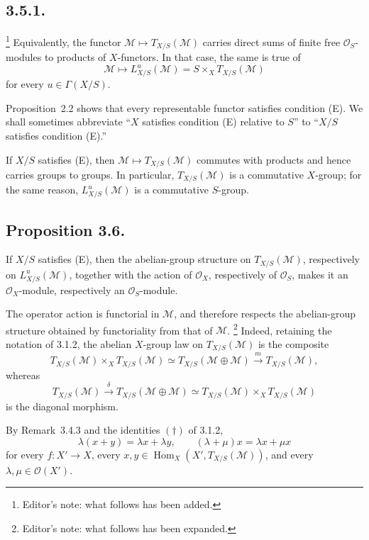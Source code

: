 \subsection*{3.5.1.}
\footnote{Editor's note: what follows has been added.}
Equivalently, the functor
\(\mathcal M\mapsto T_{X/S}(\mathcal M)\) carries direct sums of finite
free \(\mathcal O_S\)-modules to products of \(X\)-functors. In that case,
the same is true of
\[
  \mathcal M\longmapsto L^u_{X/S}(\mathcal M)
  =S\times_XT_{X/S}(\mathcal M)
\]
for every \(u\in\Gamma(X/S)\).

Proposition~2.2 shows that every representable functor satisfies
condition (E). We shall sometimes abbreviate ``\(X\) satisfies condition
(E) relative to \(S\)'' to ``\(X/S\) satisfies condition (E).''

If \(X/S\) satisfies (E), then
\(\mathcal M\mapsto T_{X/S}(\mathcal M)\) commutes with products and hence
carries groups to groups. In particular, \(T_{X/S}(\mathcal M)\) is a
commutative \(X\)-group; for the same reason,
\(L^u_{X/S}(\mathcal M)\) is a commutative \(S\)-group.

\subsection*{Proposition 3.6.}
If \(X/S\) satisfies (E), then the abelian-group structure on
\(T_{X/S}(\mathcal M)\), respectively on \(L^u_{X/S}(\mathcal M)\),
together with the action of \(\mathcal O_X\), respectively of
\(\mathcal O_S\), makes it an \(\mathcal O_X\)-module, respectively an
\(\mathcal O_S\)-module.

The operator action is functorial in \(\mathcal M\), and therefore
respects the abelian-group structure obtained by functoriality from that
of \(\mathcal M\).
\footnote{Editor's note: what follows has been expanded.}
Indeed, retaining the notation of 3.1.2, the abelian \(X\)-group law on
\(T_{X/S}(\mathcal M)\) is the composite
\[
  T_{X/S}(\mathcal M)\times_XT_{X/S}(\mathcal M)
  \simeq T_{X/S}(\mathcal M\oplus\mathcal M)
  \xrightarrow{\ m\ }T_{X/S}(\mathcal M),
\]
whereas
\[
  T_{X/S}(\mathcal M)\xrightarrow{\ \delta\ }
  T_{X/S}(\mathcal M\oplus\mathcal M)
  \simeq T_{X/S}(\mathcal M)\times_XT_{X/S}(\mathcal M)
\]
is the diagonal morphism.

By Remark~3.4.3 and the identities \((\dagger)\) of 3.1.2,
\[
  \lambda(x+y)=\lambda x+\lambda y,
  \qquad
  (\lambda+\mu)x=\lambda x+\mu x
\]
for every \(f:X'\to X\), every
\(x,y\in\operatorname{Hom}_X(X',T_{X/S}(\mathcal M))\), and every
\(\lambda,\mu\in\mathcal O(X')\).

